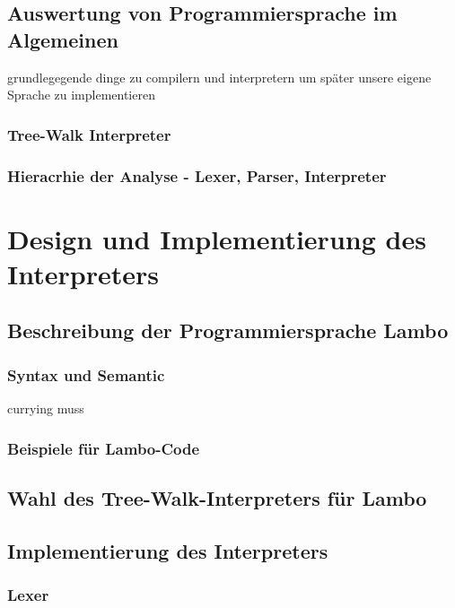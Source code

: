 \documentclass[ngerman]{article}
\newcommand{\doublelinebreak}{\par\vspace{\baselineskip}}
\begin{document}
\doublelinebreak


\subsection{Auswertung von Programmiersprache im Algemeinen}

grundlegegende dinge zu compilern und interpretern um später unsere eigene Sprache zu implementieren

\subsubsection{Tree-Walk Interpreter}

\subsubsection{Hieracrhie der Analyse - Lexer, Parser, Interpreter}


\section{Design und Implementierung des Interpreters}

\subsection{Beschreibung der Programmiersprache Lambo}

\subsubsection{Syntax und Semantic}

currying muss 
\subsubsection{Beispiele für Lambo-Code}

\subsection{Wahl des Tree-Walk-Interpreters für Lambo}

\subsection{Implementierung des Interpreters}

\subsubsection{Lexer}
\end{document}
